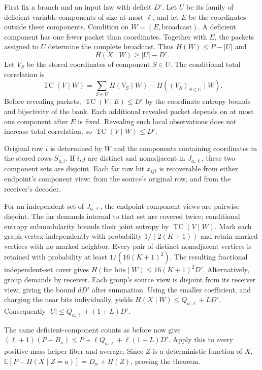 \begin{proofoutline}
First fix a branch and an input law with deficit $D'$. Let $U$ be its
family of deficient variable components of size at most $\ell$, and let
$E$ be the coordinates outside these components. Condition on
$W=(E,\text{broadcast})$. A deficient component has one fewer packet than
coordinates. Together with $E$, the packets assigned to $U$ determine the
complete broadcast. Thus $H(W)\le P-|U|$ and
\[
 H(X\mid W)\ge |U|-D'.
\]
Let $V_S$ be the stored coordinates of component $S\in U$. The conditional
total correlation is
\[
 \operatorname{TC}(V\mid W)
   =\sum_{S\in U}H(V_S\mid W)-H((V_S)_{S\in U}\mid W).
\]
Before revealing packets, $\operatorname{TC}(V\mid E)\le D'$ by the
coordinate entropy bounds and bijectivity of the bank. Each additional
revealed packet depends on at most one component after $E$ is fixed.
Revealing such local observations does not increase total correlation,
so $\operatorname{TC}(V\mid W)\le D'$.

Original row $i$ is determined by $W$ and the components containing
coordinates in the stored rows $S_{a,i}$. If $i,j$ are distinct and nonadjacent in $J_{a,\ell}$, these two
component sets are disjoint. Each far raw bit $x_{ijt}$ is recoverable from
either endpoint's component view: from the source's original row, and from
the receiver's decoder.

For an independent set of $J_{a,\ell}$, the endpoint component views are
pairwise disjoint. The far demands internal to that set are covered twice;
conditional entropy submodularity bounds their joint entropy by
$\operatorname{TC}(V\mid W)$. Mark each graph vertex independently with
probability $1/(2(K+1))$ and retain marked vertices with no marked neighbor.
Every pair of distinct nonadjacent vertices is retained with probability at least
$1/(16(K+1)^2)$. The resulting fractional independent-set cover gives
$H(\text{far bits}\mid W)\le16(K+1)^2D'$.
Alternatively, group demands by receiver. Each group's source view is
disjoint from its receiver view, giving the bound $dD'$ after summation.
Using the smaller coefficient, and charging the near bits individually,
yields $H(X\mid W)\le Q_{a,\ell}+LD'$. Consequently
$|U|\le Q_{a,\ell}+(1+L)D'$.

The same deficient-component counts as before now give
$(\ell+1)(P-B_a)\le P+\ell Q_{a,\ell}+\ell(1+L)D'$.
Apply this to every positive-mass helper fiber and average.
Since $Z$ is a deterministic function of $X$,
$\mathbb E[P-H(X\mid Z=a)]=D_w+H(Z)$, proving the theorem.
\end{proofoutline}

